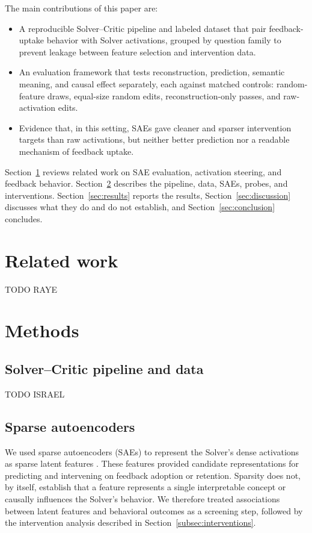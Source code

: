 \documentclass[pdflatex,sn-mathphys-num]{sn-jnl}
\theoremstyle{thmstylethree}%
\begin{document}
The main contributions of this paper are:
\begin{itemize}
\item A reproducible Solver--Critic pipeline and labeled dataset that pair feedback-uptake behavior with Solver activations, grouped by question family to
prevent leakage between feature selection and intervention data.
\item An evaluation framework that tests reconstruction, prediction, semantic meaning, and causal effect separately, each against matched controls:
random-feature draws, equal-size random edits, reconstruction-only passes, and raw-activation edits.
\item Evidence that, in this setting, SAEs gave cleaner and sparser intervention targets than raw activations, but neither better prediction nor a readable
mechanism of feedback uptake.
\end{itemize}

Section~\ref{sec:related-work} reviews related work on SAE evaluation, activation steering, and feedback behavior. Section~\ref{sec:methods} describes the
pipeline, data, SAEs, probes, and interventions. Section~\ref{sec:results} reports the results, Section~\ref{sec:discussion} discusses what they do and do
not establish, and Section~\ref{sec:conclusion} concludes.

\section{Related work}\label{sec:related-work}

TODO RAYE

\section{Methods}\label{sec:methods}

\subsection{Solver--Critic pipeline and data}\label{subsec:pipeline-data}

TODO ISRAEL

\subsection{Sparse autoencoders}\label{subsec:saes}

We used sparse autoencoders (SAEs) to represent the Solver's dense activations as sparse latent features \cite{cunningham2023sparse}.
These features provided candidate representations for predicting and intervening on feedback adoption or retention. Sparsity does not,
by itself, establish that a feature represents a single interpretable concept or causally influences the Solver's behavior. We therefore
treated associations between latent features and behavioral outcomes as a screening step, followed by the intervention analysis described in
Section~\ref{subsec:interventions}.
\end{document}
